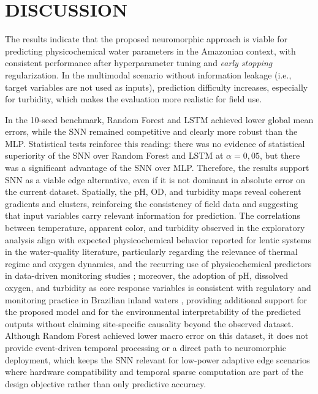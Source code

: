 \section{DISCUSSION}

The results indicate that the proposed neuromorphic approach is viable for predicting
physicochemical water parameters in the Amazonian context, with consistent performance after
hyperparameter tuning and \textit{early stopping} regularization. In the multimodal scenario
without information leakage (i.e., target variables are not used as inputs), prediction
difficulty increases, especially for turbidity, which makes the evaluation more realistic for
field use.

In the 10-seed benchmark, Random Forest and LSTM achieved lower global mean errors, while the
SNN remained competitive and clearly more robust than the MLP. Statistical tests reinforce
this reading: there was no evidence of statistical superiority of the SNN over Random Forest
and LSTM at $\alpha=0{,}05$, but there was a significant advantage of the SNN over MLP.
Therefore, the results support SNN as a viable edge alternative, even if it is not dominant
in absolute error on the current dataset. Spatially, the pH, OD, and turbidity maps reveal
coherent gradients and clusters, reinforcing the consistency of field data and suggesting
that input variables carry relevant information for prediction. The correlations between
temperature, apparent color, and turbidity observed in the exploratory analysis align with
expected physicochemical behavior reported for lentic systems in the water-quality literature,
particularly regarding the relevance of thermal regime and oxygen dynamics, and the recurring
use of physicochemical predictors in data-driven monitoring studies
\cite{jane2021widespread,yan2024}; moreover, the adoption of pH, dissolved oxygen, and
turbidity as core response variables is consistent with regulatory and monitoring practice in
Brazilian inland waters \cite{conama3572005}, providing additional support for the proposed
model and for the environmental interpretability of the predicted outputs without claiming
site-specific causality beyond the observed dataset.
Although Random Forest achieved lower macro error on this dataset, it does not provide
event-driven temporal processing or a direct path to neuromorphic deployment, which keeps the
SNN relevant for low-power adaptive edge scenarios where hardware compatibility and temporal
sparse computation are part of the design objective rather than only predictive accuracy.


